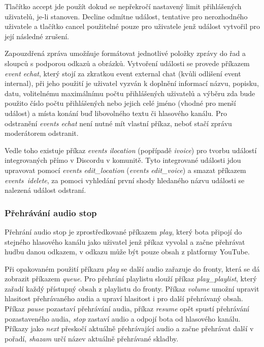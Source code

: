 \documentclass[
  program=inf,
biblatex=false,
sourcecodes=true,
joinlists=true,
  figures=true,
  tables=true,
  glossaries=true,
  index=false
]{kidiplom}
\begin{document}
Tlačítko accept jde použít dokud se nepřekročí nastavený limit přihlášených uživatelů, je-li
stanoven. Decline odmítne událost, tentative pro nerozhodného uživatele a tlačítko cancel
použitelné pouze pro uživatele jenž událost vytvořil pro její následné zrušení. 

Zapouzdřená zpráva umožňuje
formátovat jednotlivé položky zprávy do řad a sloupců s podporou odkazů a
obrázků. Vytvoření události se provede příkazem {\it event
echat}, který stojí za zkratkou event external chat (kvůli odlišení event internal), při jeho použití je
uživatel vyzván k doplnění informací názvu, popisku, datu, volitelnému maximálnímu počtu
přihlášených uživatelů a výběru zda bude použito číslo počtu přihlášených nebo jejich
celé jméno (vhodné pro menší událost) a místa konání buď libovolného textu či hlasového kanálu.
Pro odstranění {\it events echat} není nutné mít vlastní příkaz,
neboť stačí zprávu moderátorem odstranit.

Vedle toho existuje příkaz {\it events
ilocation} (popřípadě {\it ivoice}) pro tvorbu událostí integrovaných přímo v Discordu v
komunitě. Tyto integrované události jdou upravovat pomocí {\it events edit\_location}
({\it events edit\_voice}) a smazat příkazem {\it events\ idelete}, za pomoci vyhledání první shody hledaného názvu
události se nalezená událost odstraní.

\subsubsection{Přehrávání audio stop}
Přehrání
audio stop je zprostředkované příkazem {\it play}, který bota připojí do stejného hlasového
kanálu jako uživatel jenž příkaz vyvolal a začne přehrávat hudbu danou odkazem,
v odkazu může být pouze obsah z platformy YouTube. 

Při opakovaném použití
příkazu {\it play} se další audio zařazuje do fronty, která se dá zobrazit
příkazem {\it queue}. Pro přehrání playlistu slouží příkaz {\it play\_playlist}, který
zařadí každý přístupný obsah z playlistu do fronty. Příkaz {\it volume} umožní
upravit hlasitost přehrávaného audia a upraví hlasitost i pro další
přehrávaný obsah. Příkaz {\it pause} pozastaví přehrávání audia, příkaz {\it resume} opět
spustí přehrávání pozastaveného audia, {\it stop} zastaví audio a odpojí bota od
hlasového kanálu. Příkazy jako {\it next} přeskočí aktuálně přehrávající audio a
začne přehrávat další v pořadí, {\it shazam} určí název aktuálně přehrávané skladby.

\end{document}
